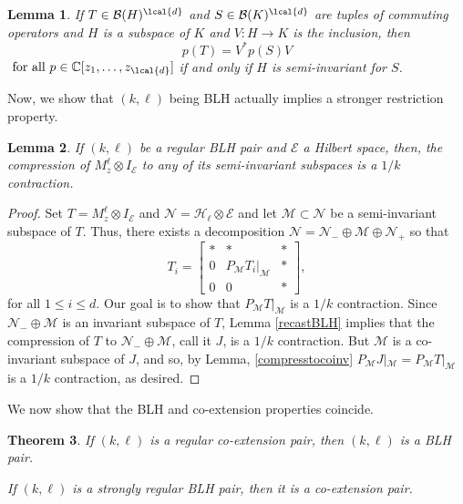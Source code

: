 \documentclass[a4paper,reqno,index]{amsart}
\numberwithin{equation}{section}
\newtheorem{theorem}{Theorem}[section]
\newtheorem{lemma}[theorem]{Lemma}
\theoremstyle{definition}
\begin{document}
\begin{lemma}\label{dilation-decomp}
If $T\in\mathcal{B}(H)^{\lcal{d}}$ and  $S\in\mathcal{B}(K)^{\lcal{d}}$ are tuples of commuting operators and  $H$ is a  subspace of $K$ and $V:H\to K$ is the inclusion, then 
\[p(T)=V^* p(S) V \]
  $\text{ for all }p\in\mathbb{C}[z_1, \dots, z_{\lcal{d}}]$
if and only if $H$ is semi-invariant for $S$.
\end{lemma}

Now, we show that $(k, \ell)$ being BLH actually implies a stronger restriction property.



\begin{lemma} \label{intermediate}
If $(k, \ell)$ be a regular BLH pair and $\mathcal{E}$ a Hilbert space,
then, the compression of $M^{\ell}_z\otimes I_{\mathcal{E}}$ 
to any of its semi-invariant subspaces is a $1/k$ contraction.
\end{lemma}

\begin{proof}
Set $T=M^{\ell}_z\otimes I_{\mathcal{E}}$ and $\mathcal{N}=\mathcal{H}_{\ell}\otimes \mathcal{E}$ and let $\mathcal{M}\subset\mathcal{N}$ be a semi-invariant subspace of $T$. Thus, there exists a decomposition  $\mathcal{N}=\mathcal{N}_{-}\oplus \mathcal{M}\oplus \mathcal{N}_{+}$ so that 
\[T_i=\begin{bmatrix}
    * & * & * \\
    0 &  P_{\mathcal{M}}T_i|_{\mathcal{M}} & * \\
    0 & 0 & * 
\end{bmatrix}, \]
for all $1\le i\le d.$ Our goal is to show that $P_{\mathcal{M}}T|_{\mathcal{M}}$ is a $1/k$ contraction. Since $\mathcal{N}_{-}\oplus\mathcal{M}$ is an invariant subspace of $T$, Lemma \ref{recastBLH} implies that the compression of $T$ to $\mathcal{N}_{-}\oplus\mathcal{M}$, call it $J$, is a $1/k$ contraction. But $\mathcal{M}$ is a co-invariant subspace of $J$, and so, by Lemma, \ref{compresstocoinv} $P_{\mathcal{M}}J|_{\mathcal{M}}=P_{\mathcal{M}}T|_{\mathcal{M}}$ is a $1/k$ contraction, as desired.
\end{proof}

We now show that the BLH and co-extension properties coincide. 

\begin{theorem} \label{BLHISCOEXT}
If $(k,\ell)$ is a regular co-extension pair, then $(k,\ell)$  is a BLH pair.

If $(k,\ell)$ is a strongly regular BLH pair, then it is a co-extension pair. 
\end{theorem}
\end{document}
